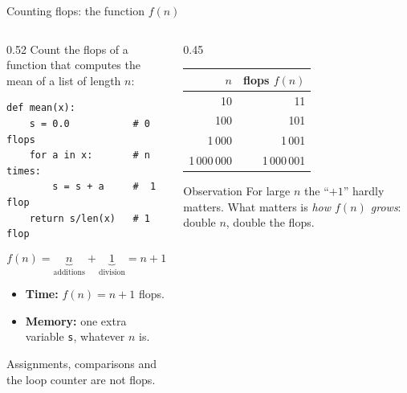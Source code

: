 \documentclass[aspectratio=169]{beamer}
\begin{document}
\begin{frame}[fragile]{Counting flops: the function $f(n)$}
\begin{columns}[T]
\begin{column}{0.52\textwidth}
\small
Count the flops of a function that computes the mean of a list of length $n$:
\begin{lstlisting}
def mean(x):
    s = 0.0           # 0 flops
    for a in x:       # n times:
        s = s + a     #  1 flop
    return s/len(x)   # 1 flop
\end{lstlisting}
\[
f(n) = \underbrace{n}_{\text{additions}} + \underbrace{1}_{\text{division}} = n + 1
\]
\begin{itemize}
  \item \textbf{Time:} $f(n) = n + 1$ flops.
  \item \textbf{Memory:} one extra variable \texttt{s}, whatever $n$ is.
\end{itemize}
\scriptsize Assignments, comparisons and the loop counter are not flops.
\end{column}
\begin{column}{0.45\textwidth}
\centering
\begin{tabular}{rr}
\toprule
$n$ & flops $f(n)$ \\
\midrule
10       & 11 \\
100      & 101 \\
1\,000   & 1\,001 \\
1\,000\,000 & 1\,000\,001 \\
\bottomrule
\end{tabular}
\vspace{0.3cm}
\begin{exampleblock}{Observation}
For large $n$ the ``$+1$'' hardly matters.
What matters is \emph{how $f(n)$ grows}: double $n$, double the flops.
\end{exampleblock}
\end{column}
\end{columns}
\end{frame}
\end{document}

